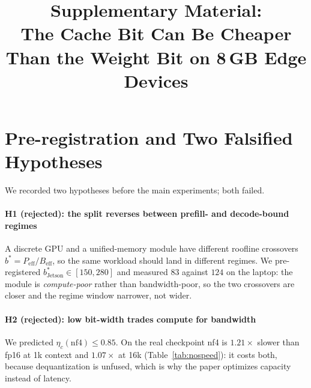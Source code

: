 \documentclass[10pt,journal]{IEEEtran}
\begin{document}
\title{Supplementary Material:\\The Cache Bit Can Be Cheaper Than the Weight Bit on 8\,GB Edge Devices}
\maketitle
\section{Pre-registration and Two Falsified Hypotheses}
\label{app:prereg}

We recorded two hypotheses before the main experiments; both failed.

\paragraph*{H1 (rejected): the split reverses between prefill- and decode-bound regimes}
A discrete GPU and a unified-memory module have different roofline crossovers
$b^* = P_{\mathrm{eff}}/B_{\mathrm{eff}}$, so the same workload should land in
different regimes. We pre-registered $b^*_{\mathrm{Jetson}} \in [150,280]$ and
measured $83$ against $124$ on the laptop: the module is \emph{compute-poor}
rather than bandwidth-poor, so the two crossovers are closer and the regime
window narrower, not wider.

\paragraph*{H2 (rejected): low bit-width trades compute for bandwidth} We
predicted $\eta_c(\text{nf4}) \le 0.85$. On the real checkpoint nf4 is
$1.21\times$ slower than fp16 at 1k context and $1.07\times$ at 16k
(Table~\ref{tab:nospeed}): it costs both, because dequantization is
unfused, which is why the paper optimizes capacity instead of latency.



\end{document}

